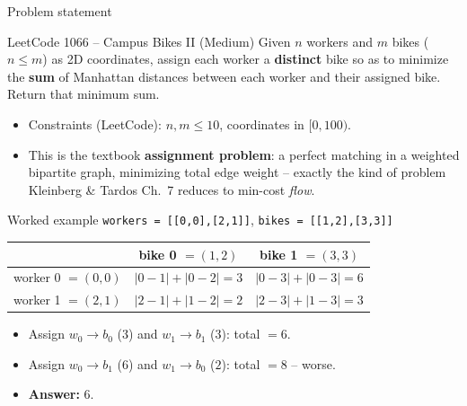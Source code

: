 \documentclass[11pt,aspectratio=169]{beamer}
\begin{document}
\begin{frame}{Problem statement}
  \begin{block}{LeetCode 1066 -- Campus Bikes II (\textcolor{blue!50!black}{Medium})}
    Given $n$ workers and $m$ bikes ($n \le m$) as 2D coordinates, assign each worker a
    \textbf{distinct} bike so as to minimize the \textbf{sum} of Manhattan distances
    between each worker and their assigned bike. Return that minimum sum.
  \end{block}
  \begin{itemize}
    \item Constraints (LeetCode): $n, m \le 10$, coordinates in $[0,100)$.
    \item This is the textbook \textbf{assignment problem}: a perfect matching in a
    weighted bipartite graph, minimizing total edge weight -- exactly the kind of
    problem Kleinberg \& Tardos Ch.\ 7 reduces to min-cost \emph{flow}.
  \end{itemize}
\end{frame}

\begin{frame}{Worked example}
  \small
  \texttt{workers = [[0,0],[2,1]]}, \quad \texttt{bikes = [[1,2],[3,3]]}
  \begin{center}
  \begin{tabular}{@{}lcc@{}}
    \toprule
     & bike 0 $=(1,2)$ & bike 1 $=(3,3)$ \\
    \midrule
    worker 0 $=(0,0)$ & $|0{-}1|{+}|0{-}2|=3$ & $|0{-}3|{+}|0{-}3|=6$ \\
    worker 1 $=(2,1)$ & $|2{-}1|{+}|1{-}2|=2$ & $|2{-}3|{+}|1{-}3|=3$ \\
    \bottomrule
  \end{tabular}
  \end{center}
  \begin{itemize}
    \item Assign $w_0\!\to\! b_0$ ($3$) and $w_1\!\to\! b_1$ ($3$): total $=6$.
    \item Assign $w_0\!\to\! b_1$ ($6$) and $w_1\!\to\! b_0$ ($2$): total $=8$ -- worse.
    \item \textbf{Answer: } $6$.
  \end{itemize}
\end{frame}
\end{document}
